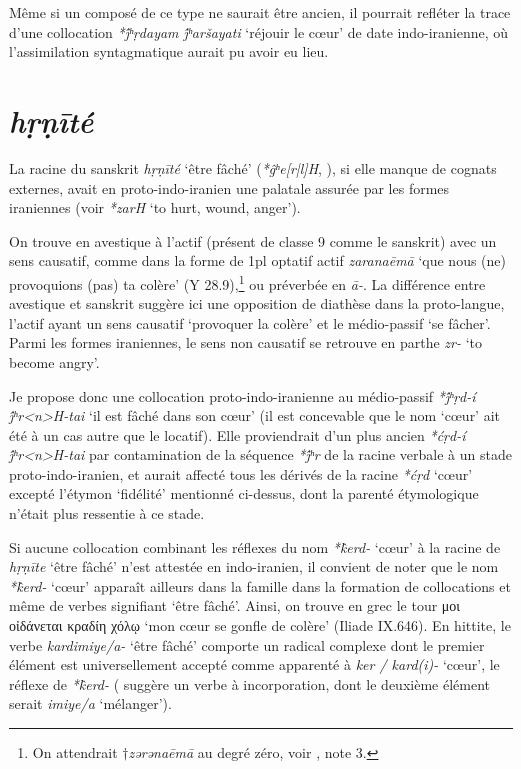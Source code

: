 \documentclass{article}
\newcommand{\ipa}[1]{{\phon\textit{#1}}}
\newcommand{\grec}[1]{{\mleccha #1}}
\begin{document}
Même si un composé de ce type ne saurait être ancien, il pourrait refléter la trace d'une collocation \ipa{*j́ʰṛdayam j́ʰaršayati} `réjouir le cœur' de date indo-iranienne, où l'assimilation syntagmatique aurait pu avoir eu lieu.


\section{\ipa{hṛṇīté}} \label{sec:hrnite}
La racine du sanskrit \ipa{hṛṇīté} `être fâché' (\ipa{*ĝʰe[r|l]H}, \citealt[178]{liv}), si elle manque de cognats externes, avait en proto-indo-iranien une palatale assurée par les formes iraniennes (voir \citealt[469]{cheung07dictionary} \ipa{*zarH} ‘to hurt, wound, anger’). 

On trouve en avestique à l'actif (présent de classe 9 comme le sanskrit) avec un sens causatif, comme dans la forme de 1pl optatif actif \ipa{zaranaēmā} `que nous (ne) provoquions (pas) ta colère' (Y 28.9),\footnote{On attendrait $\dagger$\ipa{zərənaēmā} au degré zéro, voir \citet[178]{liv}, note 3.  } ou préverbée en \ipa{ā-}. La différence entre avestique et sanskrit suggère ici une opposition de diathèse dans la proto-langue, l'actif ayant un sens causatif `provoquer la colère' et le médio-passif `se fâcher'. Parmi les formes iraniennes, le sens non causatif se retrouve en parthe \ipa{zr-} `to become angry'. 

Je propose donc une collocation proto-indo-iranienne au médio-passif \ipa{*j́ʰṛd-í j́ʰr<n>H-tai} `il est fâché dans son cœur' (il est concevable que le nom `cœur' ait été à un cas autre que le locatif).  Elle proviendrait d'un plus ancien \ipa{*ćṛd-í j́ʰr<n>H-tai} par contamination de la séquence \ipa{*j́ʰr} de la racine verbale à un stade proto-indo-iranien, et aurait affecté tous les dérivés de la racine \ipa{*ćṛd} `cœur' excepté l'étymon `fidélité' mentionné ci-dessus, dont la parenté étymologique n'était plus ressentie à ce stade.

Si aucune collocation combinant les réflexes du nom \ipa{*k̂erd-} `cœur' à la racine de \ipa{hṛṇīte} `être fâché' n'est attestée en indo-iranien, il convient de noter que  le nom \ipa{*k̂erd-} `cœur' apparaît ailleurs dans la famille dans la formation de collocations et même de verbes signifiant `être fâché'. Ainsi, on trouve en grec le tour 
\grec{μοι οἰδάνεται κραδίη χόλῳ} `mon cœur se gonfle de colère' (Iliade IX.646). En hittite, le verbe  \ipa{kardimiye/a-} `être fâché' comporte un radical complexe dont le premier élément est universellement accepté comme apparenté à \ipa{ker / kard(i)-} `cœur', le réflexe de \ipa{*k̂erd-} (\citealt[456-7]{kloekhorst08edhil} suggère un verbe à incorporation, dont le deuxième élément serait \ipa{imiye/a} `mélanger'). 
\end{document}

